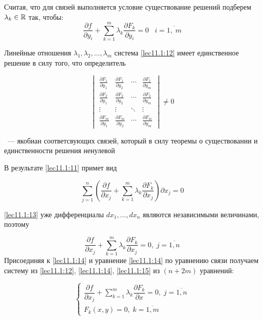 \documentclass[../../main.tex]{subfiles}
\begin{document}
	Считая, что для связей выполняется условие существование 
	решений подберем $\lambda_k \in \mathbb{R}$ так, чтобы:
	\begin{equation}
	\dfrac{\partial f}{\partial y_i} + \sum\limits_{k = 1}^m \lambda_k 
	\dfrac{\partial F_k}{\partial y_i} = 0 \;\;\; i = \overline{1, \; m} 
	\label{lec11.1:12}
	\end{equation}
	
	Линейные отношения $\lambda_1, \lambda_2, \ldots, \lambda_m$ система 
	\eqref{lec11.1:12} имеет единственное решение в силу того, что определитель
	
	\[
	\begin{vmatrix}
	\frac{\partial F_1}{\partial y_1} & \frac{\partial F_1}{\partial y_2}
	& \cdots & \frac{\partial F_1}{\partial y_m} \\
	\frac{\partial F_2}{\partial y_1} & \frac{\partial F_2}{\partial y_2} 
	& \cdots & \frac{\partial F_2}{\partial y_m} \\
	\vdots  & \vdots  & \ddots & \vdots  \\
	\frac{\partial F_m}{\partial y_1} & \frac{\partial F_m}{\partial y_2}
	& \cdots & \frac{\partial F_m}{\partial y_m}
	\end{vmatrix} \ne 0 
	\]
	\smallskip
	
	~--- якобиан соответсвующих связей, который в силу теоремы о существовании
	и единственности решения ненулевой 
	
	
	В результате \eqref{lec11.1:11} примет вид
	
	\begin{equation}
	\label{lec11.1:13}
	\sum\limits_{j=1}^{n}\left(  \dfrac{\partial f }{\partial x_j} + 
	\sum\limits_{k=1}^{m} \lambda_k\dfrac{\partial F_k }{\partial x_j}  
	\right) \partial x_j =0 
	\end{equation}
	
	\eqref{lec11.1:13} уже дифференциалы
	$d x_1,\ldots,d x_n$ являются независимыми величинами, поэтому
	
	\[
	\label{lec11.1:14}
	\dfrac{\partial f }{\partial x_j} + \sum\limits_{k=1}^{m}
	\lambda_k \dfrac{\partial F_k }{\partial x_j} = 0,\; j = \overline{1, n}
	\]
	Присоединяя к \eqref{lec11.1:14}  и уравнение \eqref{lec11.1:14} по 
	уравнению связи получаем \smallskip систему из \eqref{lec11.1:12}, 
	\eqref{lec11.1:14},
	\eqref{lec11.1:15} из $ \left( n + 2m \right) $ уравнений:
	
	\begin{equation}
	\label{lec11.1:15}
	\begin{cases}
	\dfrac{\partial f }{\partial x_j} + \sum\limits_{k=1}^{m}
	\lambda_k \dfrac{\partial F_k }{\partial x} = 0,\; j = \overline{1, n}\\
	F_k\left( x, y \right) = 0,\; k = \overline{1, m}
	\end{cases}
	\end{equation}
	
\end{document}
